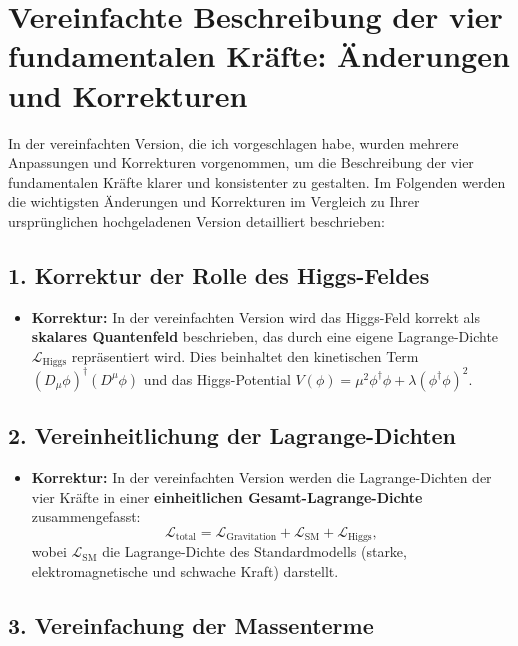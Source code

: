 \documentclass{article}
\begin{document}
	\section{Vereinfachte Beschreibung der vier fundamentalen Kräfte: Änderungen und Korrekturen}
	
	In der vereinfachten Version, die ich vorgeschlagen habe, wurden mehrere Anpassungen und Korrekturen vorgenommen, um die Beschreibung der vier fundamentalen Kräfte klarer und konsistenter zu gestalten. Im Folgenden werden die wichtigsten Änderungen und Korrekturen im Vergleich zu Ihrer ursprünglichen hochgeladenen Version detailliert beschrieben:
	
	\subsection{1. Korrektur der Rolle des Higgs-Feldes}
	
	\begin{itemize}
		\item \textbf{Korrektur:} In der vereinfachten Version wird das Higgs-Feld korrekt als \textbf{skalares Quantenfeld} beschrieben, das durch eine eigene Lagrange-Dichte $\mathcal{L}_\text{Higgs}$ repräsentiert wird. Dies beinhaltet den kinetischen Term $(D_\mu \phi)^\dagger (D^\mu \phi)$ und das Higgs-Potential $V(\phi) = \mu^2 \phi^\dagger \phi + \lambda (\phi^\dagger \phi)^2$.
	\end{itemize}
	
	\subsection{2. Vereinheitlichung der Lagrange-Dichten}
	
	\begin{itemize}
		\item \textbf{Korrektur:} In der vereinfachten Version werden die Lagrange-Dichten der vier Kräfte in einer \textbf{einheitlichen Gesamt-Lagrange-Dichte} zusammengefasst:
		\[
		\mathcal{L}_\text{total} = \mathcal{L}_\text{Gravitation} + \mathcal{L}_\text{SM} + \mathcal{L}_\text{Higgs},
		\]
		wobei $\mathcal{L}_\text{SM}$ die Lagrange-Dichte des Standardmodells (starke, elektromagnetische und schwache Kraft) darstellt.
	\end{itemize}
	
	\subsection{3. Vereinfachung der Massenterme}
	
\end{document}
